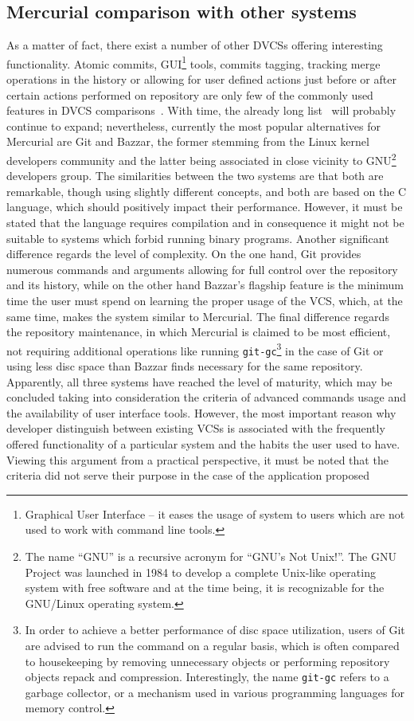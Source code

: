 \subsection{Mercurial comparison with other systems}\label{subsec:dvcs_compare}
As a matter of fact, there exist a number of other DVCSs offering interesting functionality. Atomic commits, GUI\footnote{Graphical User Interface -- it eases the usage of system to users which are not used to work with command line tools.} tools, commits tagging, tracking merge operations in the history or allowing for user defined actions just before or after certain actions performed on repository are only few of the commonly used features in DVCS comparisons~\cite{wiki_dvcs_compare}. With time, the already long list~\cite{wiki_dvcs_list} will probably continue to expand; nevertheless, currently the most popular alternatives for Mercurial are Git and Bazzar, the former stemming from the Linux kernel developers community and the latter being associated in close vicinity to GNU\footnote{The name “GNU” is a recursive acronym for “GNU's Not Unix!”. The GNU Project was launched in 1984 to develop a complete Unix-like operating system with free software and at the time being, it is recognizable for the GNU/Linux operating system.} developers group. The similarities between the two systems are that both are remarkable, though using slightly different concepts, and both are based on the C language, which should positively impact their performance. However, it must be stated that the language requires compilation and in consequence it might not be suitable to systems which forbid running binary programs. Another significant difference regards the level of complexity. On the one hand, Git provides numerous commands and arguments allowing for full control over the repository and its history, while on the other hand Bazzar's flagship feature is the minimum time the user must spend on learning the proper usage of the VCS, which, at the same time, makes the system similar to Mercurial. The final difference regards the repository maintenance, in which Mercurial is claimed to be most efficient, not requiring additional operations like running \texttt{git-gc}\footnote{In order to achieve a better performance of disc space utilization, users of Git are advised to run the command on a regular basis, which is often compared to housekeeping by removing unnecessary objects or performing repository objects repack and compression. Interestingly, the name \texttt{git-gc} refers to a garbage collector, or a mechanism used in various programming languages for memory control.} in the case of Git or using less disc space than Bazzar finds necessary for the same repository. Apparently, all three systems have reached the level of maturity, which may be concluded taking into consideration the criteria of advanced commands usage and the availability of user interface tools. However, the most important reason why developer distinguish between existing VCSs is associated with the frequently offered functionality of a particular system and the habits the user used to have. Viewing this argument from a practical perspective, it must be noted that the criteria did not serve their purpose in the case of the application proposed 